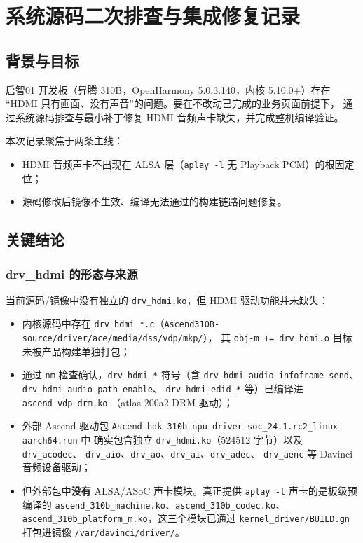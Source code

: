 
\chapter{系统源码二次排查与集成修复记录}

\section{背景与目标}

启智01 开发板（昇腾 310B，OpenHarmony 5.0.3.140，内核 5.10.0+）存在
``HDMI 只有画面、没有声音''的问题。要在不改动已完成的业务页面前提下，
通过系统源码排查与最小补丁修复 HDMI 音频声卡缺失，并完成整机编译验证。

本次记录聚焦于两条主线：
\begin{itemize}
  \item HDMI 音频声卡不出现在 ALSA 层（\texttt{aplay -l} 无 Playback PCM）的根因定位；
  \item 源码修改后镜像不生效、编译无法通过的构建链路问题修复。
\end{itemize}

\section{关键结论}

\subsection{drv\_hdmi 的形态与来源}

当前源码/镜像中没有独立的 \texttt{drv\_hdmi.ko}，但 HDMI 驱动功能并未缺失：
\begin{itemize}
  \item 内核源码中存在 \texttt{drv\_hdmi\_*.c}（\texttt{Ascend310B-source/driver/ace/media/dss/vdp/mkp/}），
  其 \texttt{obj-m += drv\_hdmi.o} 目标未被产品构建单独打包；
  \item 通过 \texttt{nm} 检查确认，\texttt{drv\_hdmi\_*} 符号（含
  \texttt{drv\_hdmi\_audio\_infoframe\_send}、\texttt{drv\_hdmi\_audio\_path\_enable}、
  \texttt{drv\_hdmi\_edid\_*} 等）已编译进 \texttt{ascend\_vdp\_drm.ko}
  （atlas-200a2 DRM 驱动）；
  \item 外部 Ascend 驱动包
  \texttt{Ascend-hdk-310b-npu-driver-soc\_24.1.rc2\_linux-aarch64.run} 中
  确实包含独立 \texttt{drv\_hdmi.ko}（524512 字节）以及 \texttt{drv\_acodec}、
  \texttt{drv\_aio}、\texttt{drv\_ao}、\texttt{drv\_ai}、\texttt{drv\_adec}、
  \texttt{drv\_aenc} 等 Davinci 音频设备驱动；
  \item 但外部包中\textbf{没有} ALSA/ASoC 声卡模块。真正提供
  \texttt{aplay -l} 声卡的是板级预编译的
  \texttt{ascend\_310b\_machine.ko}、\texttt{ascend\_310b\_codec.ko}、
  \texttt{ascend\_310b\_platform\_m.ko}，这三个模块已通过
  \texttt{kernel\_driver/BUILD.gn} 打包进镜像 \texttt{/var/davinci/driver/}。
\end{itemize}

